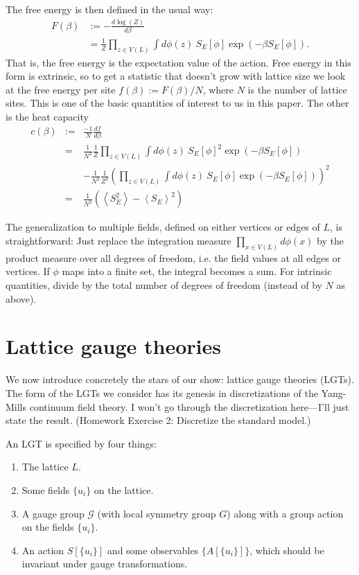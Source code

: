 \documentclass[9pt,twocolumn,twoside]{article}
\begin{document}
The free energy is then defined in the usual way:
\begin{align*}
F(\beta)& := -\frac{d \log(Z)}{d\beta}\\
& = \frac{1}{Z}  \prod_{z\in V(L)}\int d\phi(z) \: S_E[\phi] \exp(-\beta S_E[\phi]).
\end{align*}
That is, the free energy is the expectation value of the action.  Free energy in this form is extrinsic, so to get a statistic that doesn't grow with lattice size we look at the free energy per site $f(\beta):=F(\beta)/N$, where $N$ is the number of lattice sites.  This is one of the basic quantities of interest to us in this paper.  The other is the heat capacity 
\begin{eqnarray*}
c(\beta)& := & \frac{-1}{N}\frac{df}{d\beta}\\
& = & \frac{1}{N^2}\frac{1}{Z}  \prod_{z\in V(L)}\int d\phi(z) \: S_E[\phi]^2 \exp(-\beta S_E[\phi]) \\
& & -\frac{1}{N^2}\frac{1}{Z^2} \left( \prod_{z\in V(L)}\int d\phi(z) \: S_E[\phi] \exp(-\beta S_E[\phi])\right)^2 \\
& = & \frac{1}{N^2}\left(\left<S_E^2\right> - \left<S_E\right>^2\right)
\end{eqnarray*}

The generalization to multiple fields, defined on either vertices or edges of $L$, is straightforward: Just replace the integration measure $\prod_{x \in V(L)}  d\phi(x)$ by the product measure over all degrees of freedom, i.e. the field values at all edges or vertices.  If $\phi$ maps into a finite set, the integral becomes a sum.  For intrinsic quantities, divide by the total number of degrees of freedom (instead of by $N$ as above).

\section{Lattice gauge theories}
We now introduce concretely the stars of our show: lattice gauge theories (LGTs).  The form of the LGTs we consider has its genesis in discretizations of the Yang-Mills continuum field theory.  I won't go through the discretization here---I'll just state the result.  (Homework Exercise 2: Discretize the standard model.)

An LGT is specified by four things:
\begin{enumerate}
\item The lattice $L$.
\item Some fields $\{u_i\}$ on the lattice.
\item A gauge group $\mathcal{G}$ (with local symmetry group $G$) along with a group action on the fields $\{u_i\}$.
\item An action $S[\{u_i\}]$ and some observables $\{A[\{u_i\}]\}$, which should be invariant under gauge transformations.
\end{enumerate}
\end{document}
